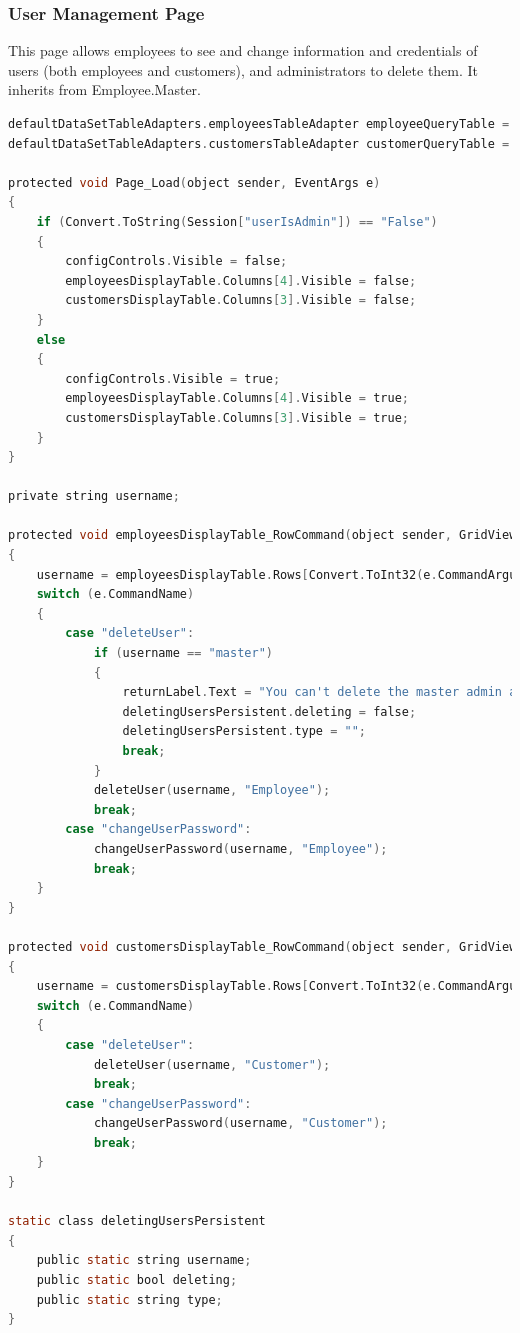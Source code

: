 ﻿\documentclass{article}
\begin{document}
    \subsubsection{User Management Page}
    This page allows employees to see and change information and credentials of users (both employees and customers), and administrators to delete them.
    It inherits from Employee.Master.
    \begin{lstlisting}[language=C]
defaultDataSetTableAdapters.employeesTableAdapter employeeQueryTable = new defaultDataSetTableAdapters.employeesTableAdapter();
defaultDataSetTableAdapters.customersTableAdapter customerQueryTable = new defaultDataSetTableAdapters.customersTableAdapter();

protected void Page_Load(object sender, EventArgs e)
{
    if (Convert.ToString(Session["userIsAdmin"]) == "False")
    {
        configControls.Visible = false;
        employeesDisplayTable.Columns[4].Visible = false;
        customersDisplayTable.Columns[3].Visible = false;
    }
    else
    {
        configControls.Visible = true;
        employeesDisplayTable.Columns[4].Visible = true;
        customersDisplayTable.Columns[3].Visible = true;
    }
}

private string username;

protected void employeesDisplayTable_RowCommand(object sender, GridViewCommandEventArgs e)
{
    username = employeesDisplayTable.Rows[Convert.ToInt32(e.CommandArgument)].Cells[0].Text;
    switch (e.CommandName)
    {
        case "deleteUser":
            if (username == "master")
            {
                returnLabel.Text = "You can't delete the master admin account!";
                deletingUsersPersistent.deleting = false;
                deletingUsersPersistent.type = "";
                break;
            }
            deleteUser(username, "Employee");
            break;
        case "changeUserPassword":
            changeUserPassword(username, "Employee");
            break;
    }
}

protected void customersDisplayTable_RowCommand(object sender, GridViewCommandEventArgs e)
{
    username = customersDisplayTable.Rows[Convert.ToInt32(e.CommandArgument)].Cells[0].Text;
    switch (e.CommandName)
    {
        case "deleteUser":
            deleteUser(username, "Customer");
            break;
        case "changeUserPassword":
            changeUserPassword(username, "Customer");
            break;
    }
}

static class deletingUsersPersistent
{
    public static string username;
    public static bool deleting;
    public static string type;
}


\end{lstlisting}
\end{document}
